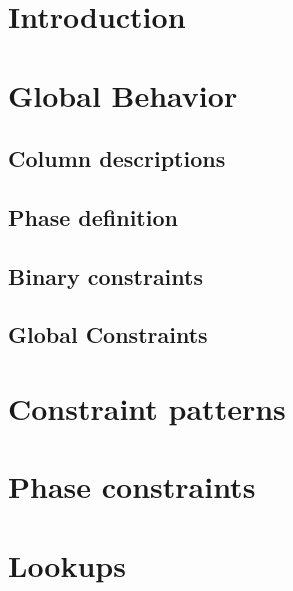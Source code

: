 \section{Introduction}                   
\section{Global Behavior}
\subsection{Column descriptions}         
\subsection{Phase definition}            
\subsection{Binary constraints}          
\subsection{Global Constraints}          

\section{Constraint patterns}            

\section{Phase constraints}              

\section{Lookups}                        
